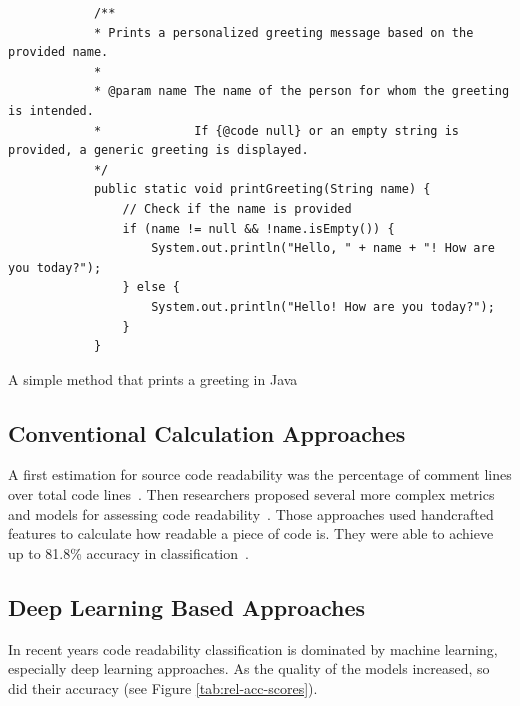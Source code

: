 \documentclass[%
class=scrreprt,
chapterprefix=false,%
open=right,%
twoside=false,%
paper=a4,%
logofile={Logo\_zentral\_farbig\_EN.png},%
thesistype=master,%
UKenglish,%
]{se2thesis}
\theoremstyle{definition}
\begin{document}
	
	\begin{listing}[!ht]
		\begin{verbatim}
			/**
			* Prints a personalized greeting message based on the provided name.
			*
			* @param name The name of the person for whom the greeting is intended.
			*             If {@code null} or an empty string is provided, a generic greeting is displayed.
			*/
			public static void printGreeting(String name) {
				// Check if the name is provided
				if (name != null && !name.isEmpty()) {
					System.out.println("Hello, " + name + "! How are you today?");
				} else {
					System.out.println("Hello! How are you today?");
				}
			}
		\end{verbatim}
		\caption{A simple method that prints a greeting in Java}
		\label{lst:print-greeting}
	\end{listing}
	

	
	
%	
%	
%	
	
\subsection{Conventional Calculation Approaches} \label{Classical Calculation Approaches}
	A first estimation for source code readability was the percentage of comment lines over total code lines~\cite{aggarwal2002integrated}. Then researchers proposed several more complex metrics and models for assessing code readability~\cite{buse2009learning, posnett2011simpler, dorn2012general, scalabrino2018comprehensive}.
	Those approaches used handcrafted features to calculate how readable a piece of code is. They were able to achieve up to 81.8\% accuracy in classification~\cite{scalabrino2018comprehensive}.
	
\subsection{Deep Learning Based Approaches} \label{Deep Learning Based Approaches}
	In recent years code readability classification is dominated by machine learning, especially deep learning approaches. As the quality of the models increased, so did their accuracy (see Figure \ref{tab:rel-acc-scores}).
	
\end{document}
